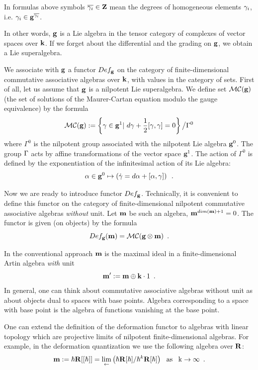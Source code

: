  In formulas above
 symbols $\overline{{\gamma}_i}\in{\bf Z}$ mean the degrees of  homogeneous elements 
 ${\gamma}_i$, i.e. 
 ${\gamma}_i\in {\bf g}^{\overline{{\gamma}_i}}$.
 
  In other words, ${\bf g}$ is a Lie algebra in the  tensor 
  category 
  of complexes
   of vector spaces over ${\bf k}$. If we forget about the differential 
   and the grading
    on ${\bf g}$, we obtain a Lie superalgebra.


 We associate with ${\bf g}$ 
a functor $Def_{{\bf g}}$ 
on the category of finite-dimensional commutative 
associative
 algebras over ${\bf k}$,
  with values in the category of sets. 
 First of all, let us assume that ${\bf g}$ is  a nilpotent 
  Lie superalgebra.
  We define set ${\cal MC}({\bf g})$  (the set of solutions of the Maurer-Cartan equation
   modulo the gauge equivalence)
   by the formula
  $${\cal MC}({\bf g}):=\left\{{\gamma}\in {\bf g}^1| \,\,d{\gamma}+{1\over  2}[{\gamma},{\gamma}]=0\right\}\big/
  \Gamma^0$$
  where $\Gamma^0$ is the nilpotent group associated with the nilpotent 
  Lie algebra ${\bf g}^0$. The group ${\Gamma}$ acts by affine transformations 
  of the vector space ${\bf g}^1$. The action of $\Gamma^0$ is defined by
  the exponentiation of the infinitesimal action of its Lie algebra:
  $$\alpha\in {\bf g}^0\mapsto \left(\dot{{\gamma}}=d\alpha+[\alpha,{\gamma}]\right)\,\,\,.$$
  

 
 Now we are ready to introduce  functor $Def_{\bf g}$. Technically, it is convenient
  to define this functor on the category of
  finite-dimensional nilpotent commutative associative algebras 
  {\it without}  unit.
   Let ${\bf m}$ be such an algebra, 
  ${\bf m}^{dim({\bf m})+1}=0$. 
  The functor is given (on objects) by the formula
  $$Def_{\bf g}({\bf m})={\cal MC}({\bf g}\otimes {\bf m})\,\,\,.$$
  
  In the conventional approach ${\bf m}$ is the maximal ideal in a 
  finite-dimensional
   Artin algebra {\it with} unit $${\bf m}':={\bf m}\oplus 
   {\bf k}\cdot {\rm 1}\,\,\,.$$
  In general, one can think about  commutative associative
     algebras without unit as about objects dual to  spaces with base points.
      Algebra corresponding to a space with  base point is the algebra of
       functions vanishing at the base point.
        
        One can  extend the definition of the
         deformation functor to 
         algebras with linear topology
         which are 
       projective limits of nilpotent finite-dimensional algebras. For 
       example, in the deformation quantization we use the following
        algebra  
        over ${\bf R}$:  
        $${\bf m}:=\hbar{\bf R}[[\hbar]]=\lim_{{\leftarrow}}\left({\hbar}{\bf R}[{\hbar}]/{\hbar}^k{\bf R}[{\hbar}]\right)
        \rm{\,\,\,\,as\,\,\,\,\,}k\to\infty\,\,\,.$$
        

